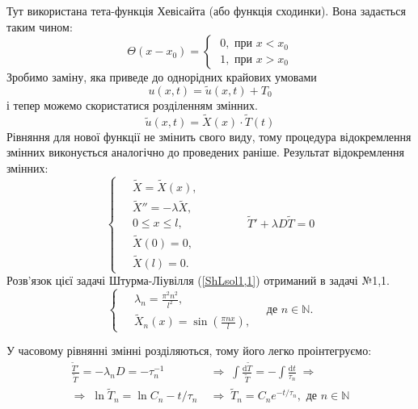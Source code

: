 Тут використана тета-функція Хевісайта (або функція сходинки). Вона задається таким чином:
\begin{equation*}
    \Theta(x - x_0) = 
    \begin{cases}
        \;0, \text{ при } x < x_0\\
        \;1, \text{ при } x > x_0
    \end{cases}    
\end{equation*}
Зробимо заміну, яка приведе до однорідних крайових умовами\[u(x,t) = \widetilde{u}(x,t) + T_0 \] і тепер можемо скористатися розділенням змінних.
\begin{equation} \label{subst4,2}
    \widetilde{u}(x,t) = \widetilde{X}(x)\cdot\widetilde{T}(t) 
\end{equation}
Рівняння для нової функції не змінить свого виду, тому процедура відокремлення змінних виконується аналогічно до проведених раніше. Результат відокремлення змінних:
\begin{equation} 
    \left\{ \begin{aligned}
        \;&\widetilde{X} = \widetilde{X}(x), \\  &\widetilde{X}'' = -\lambda \widetilde{X}, \\ &0 \leq x \leq l, \\  &\widetilde{X}(0) = 0, \\ &\widetilde{X}(l) = 0. 
    \end{aligned} \right.
    \qquad\qquad
    \widetilde{T}' + \lambda D \widetilde{T} = 0
\end{equation}
Розв'язок цієї задачі Штурма-Ліувілля (\ref{ShLsol1,1}) отриманий в задачі №1,1.
\begin{equation} 
    \left\{ \begin{aligned}
        \;&\lambda_n = \frac{\pi^2 n^2}{l^2},\\ 
        &\widetilde{X}_n(x) = \sin\left(\frac{\pi n x}{l}\right),
    \end{aligned} \right.
    \quad \text{де } n \in \mathbb{N}.
\end{equation}

У часовому рівнянні змінні розділяються, тому його легко проінтегруємо:
\begin{equation} \label{time-eq4,2}
    \begin{aligned}
        \frac{\widetilde{T}'}{\widetilde{T}} = -\lambda_n D = -\tau_n^{-1}
        \;&\Rightarrow\;
        \int \frac{\mathrm{d} \widetilde{T}}{\widetilde{T}} = - \int \frac{\mathrm{d} t}{\tau_n}
        \;\Rightarrow\\
        \Rightarrow\;
        \ln{\widetilde{T}_n} = \ln{C_n} - t/\tau_n
        \;&\Rightarrow\;
        \widetilde{T}_n = C_n e^{-t/\tau_n}, \text{ де } n \in \mathbb{N}
    \end{aligned}
\end{equation}

